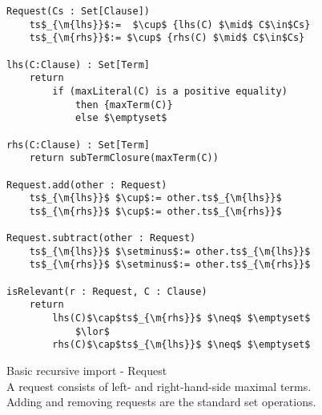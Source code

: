 \begin{figure}
\begin{lstlisting}
Request(Cs : Set[Clause])
	ts$_{\m{lhs}}$:=  $\cup$ {lhs(C) $\mid$ C$\in$Cs}
	ts$_{\m{rhs}}$:= $\cup$ {rhs(C) $\mid$ C$\in$Cs}
	
lhs(C:Clause) : Set[Term]
	return 
		if (maxLiteral(C) is a positive equality) 
			then {maxTerm(C)}
			else $\emptyset$

rhs(C:Clause) : Set[Term]
	return subTermClosure(maxTerm(C)) 
	
Request.add(other : Request)
	ts$_{\m{lhs}}$ $\cup$:= other.ts$_{\m{lhs}}$
	ts$_{\m{rhs}}$ $\cup$:= other.ts$_{\m{rhs}}$
	
Request.subtract(other : Request)
	ts$_{\m{lhs}}$ $\setminus$:= other.ts$_{\m{lhs}}$
	ts$_{\m{rhs}}$ $\setminus$:= other.ts$_{\m{rhs}}$

isRelevant(r : Request, C : Clause)
	return 
		lhs(C)$\cap$ts$_{\m{rhs}}$ $\neq$ $\emptyset$
			$\lor$
		rhs(C)$\cap$ts$_{\m{lhs}}$ $\neq$ $\emptyset$
\end{lstlisting}
\caption{Basic recursive import - Request\\
A request consists of left- and right-hand-side maximal terms.\\
Adding and removing requests are the standard set operations.
}
\label{basic_verification.4.request}
\end{figure}

